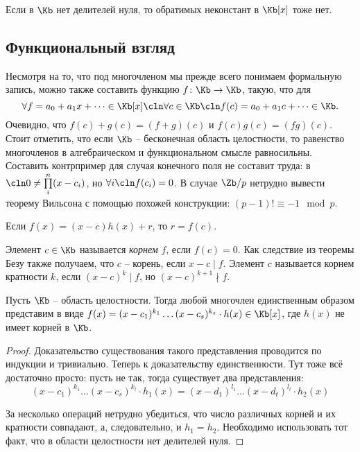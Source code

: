 Если в $\Kb$ нет делителей нуля, то обратимых неконстант в $\Kb[x]$ тоже нет.

\subsection{Функциональный взгляд}

Несмотря на то, что под многочленом мы прежде всего понимаем формальную запись, можно также составить функцию $f\colon \Kb\to\Kb$, такую, что для $$\forall f=a_0+a_1x+\dots\in\Kb[x]\cln\forall c\in\Kb\cln f(c)=a_0+a_1c+\dots\in\Kb.$$
Очевидно, что $f(c)+g(c)=(f+g)(c)$ и $f(c)g(c)=(fg)(c)$. Стоит отметить, что если $\Kb$ -- бесконечная область целостности, то равенство многочленов в алгебраическом и функциональном смысле равносильны. Составить контрпример для случая конечного поля не составит труда: в $\cln0\ne\prod\limits_i^n(x-c_i)$, но $\forall i\cln f(c_i)=0$. В случае $\Zb/p$ нетрудно вывести теорему Вильсона с помощью похожей конструкции: $(p-1)!\equiv-1\mod p$.

\begin{theorem}[Безу]
Если $f(x)=(x-c)h(x)+r$, то $r=f(c)$.
\end{theorem}

\begin{df}
  Элемент $c\in\Kb$ называется \emph{корнем} $f$, если $f(c)=0$. Как следствие из теоремы Безу также получаем, что $c$ -- корень, если $x-c\mid f$. Элемент $c$ называется корнем кратности $k$, если $(x-c)^k\mid f$, но $(x-c)^{k+1}\nmid f$.
\end{df}

\begin{theorem}
  Пусть $\Kb$ -- область целостности. Тогда любой многочлен единственным образом представим в виде $f(x)=(x-c_1)^{k_1}\dots(x-c_s)^{k_s}\cdot h(x)\in\Kb[x]$, где $h(x)$ не имеет корней в $\Kb$.
\end{theorem}
\begin{proof}
  Доказательство существования такого представления проводится по индукции и тривиально. Теперь к доказательству единственности. Тут тоже всё достаточно просто: пусть не так, тогда существует два представления:
  $$(x-c_1)^{k_1}\dots(x-c_s)^{k_l}\cdot h_1(x)= (x-d_1)^{l_1}\dots(x-d_t)^{l_l}\cdot h_2(x)$$

  За несколько операций нетрудно убедиться, что число различных корней и их кратности совпадают, а, следовательно, и $h_1=h_2$. Необходимо использовать тот факт, что в области целостности нет делителей нуля.
\end{proof}

